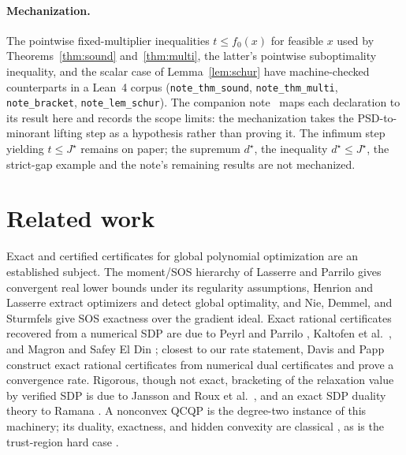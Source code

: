 \documentclass[11pt]{article}
\theoremstyle{plain}
\theoremstyle{remark}
\begin{document}
\paragraph{Mechanization.} The pointwise fixed-multiplier inequalities
$t\le f_0(x)$ for feasible $x$ used by Theorems~\ref{thm:sound}
and~\ref{thm:multi}, the latter's pointwise suboptimality inequality, and the scalar case
of Lemma~\ref{lem:schur} have machine-checked counterparts in a Lean~4 corpus
(\texttt{note\_thm\_sound}, \texttt{note\_thm\_multi}, \texttt{note\_bracket},
\texttt{note\_lem\_schur}). The companion note~\cite{oltean2026leannote} maps each
declaration to its result here and records the scope limits: the mechanization
takes the PSD-to-minorant lifting step as a hypothesis rather than proving it.
The infimum step yielding $t\le J^\star$ remains on paper;
the supremum $d^\star$, the inequality $d^\star\le J^\star$, the strict-gap
example and the note's remaining results are not mechanized.

\section{Related work}

Exact and certified certificates for global polynomial optimization are an
established subject. The moment/SOS hierarchy of Lasserre \cite{lasserre2001} and
Parrilo \cite{parrilo2003} gives convergent real lower bounds under its regularity assumptions, Henrion and
Lasserre \cite{henrion2005} extract optimizers and detect global optimality, and
Nie, Demmel, and Sturmfels \cite{nie2006} give SOS exactness over the gradient
ideal. Exact rational certificates recovered from a numerical SDP are due to
Peyrl and Parrilo \cite{peyrl2008}, Kaltofen et al.\ \cite{kaltofen2012}, and
Magron and Safey El Din \cite{magron2018}; closest to our rate statement, Davis
and Papp \cite{davis2022} construct exact rational certificates from numerical
dual certificates and prove a convergence rate. Rigorous, though not exact,
bracketing of the relaxation value by verified SDP is due to Jansson
\cite{jansson2009} and Roux et al.\ \cite{roux2018}, and an exact SDP duality
theory to Ramana \cite{ramana1997}. A nonconvex QCQP is the degree-two instance
of this machinery; its duality, exactness, and hidden convexity are classical
\cite{yakubovich1971,shor1987,polik2007,bental1996,beck2006,jeyakumar2014}, as is
the trust-region hard case \cite{moresorensen1983,adachi2017}.
\end{document}
